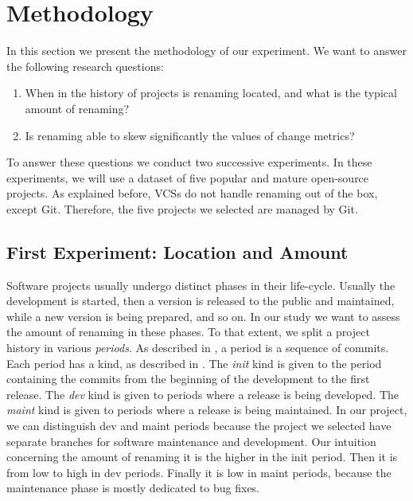 \section{Methodology}
\label{sec:methodology}

In this section we present the methodology of our experiment. We want to answer the following research questions:

\begin{enumerate}
	\item When in the history of projects is renaming located, and what is the typical amount of renaming?
	\item Is renaming able to skew significantly the values of change metrics?
\end{enumerate}

To answer these questions we conduct two successive experiments. In these experiments, we will use a dataset of five popular and mature open-source projects. As explained before, VCSs do not handle renaming out of the box, except Git. Therefore, the five projects we selected are managed by Git.

\subsection{First Experiment: Location and Amount}

Software projects usually undergo distinct phases in their life-cycle. Usually the development is started, then a version is released to the public and maintained, while a new version is being prepared, and so on. In our study we want to assess the amount of renaming in these phases. To that extent, we split a project history in various \emph{periods}. As described in , a period is a sequence of commits. Each period has a kind, as described in . The \emph{init} kind is given to the period containing the commits from the beginning of the development to the first release. The \emph{dev} kind is given to periods where a release is being developed. The \emph{maint} kind is given to periods where a release is being maintained. In our project, we can distinguish dev and maint periods because the project we selected have separate branches for software maintenance and development. Our intuition concerning the amount of renaming it is the higher in the init period. Then it is from low to high in dev periods. Finally it is low in maint periods, because the maintenance phase is mostly dedicated to bug fixes.

